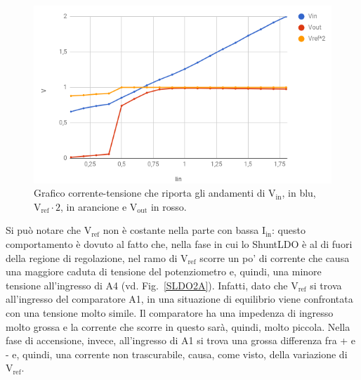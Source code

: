 \begin{figure}
\centering
\includegraphics[scale=.5]{Immagini/SLDO2Astatic}
\caption{Grafico corrente-tensione che riporta gli andamenti di $\mathrm{V_{in}}$, in blu, $\mathrm{V_{ref}\cdot 2}$, in arancione e $\mathrm{V_{out}}$ in rosso.}
\label{SLDO2Astatic}
\end{figure}
Si può notare che $\mathrm{V_{ref}}$ non è costante nella parte con bassa $\mathrm{I_{in}}$: questo comportamento è dovuto al fatto che, nella fase in cui lo ShuntLDO \`e al di fuori della regione di regolazione, nel ramo di $\mathrm{V_{ref}}$ scorre un po' di corrente che causa una maggiore caduta di tensione del potenziometro e, quindi, una minore tensione all'ingresso di A4 (vd. Fig.~\ref{SLDO2A}).
Infatti, dato che $\mathrm{V_{ref}}$ si trova all'ingresso del comparatore A1, in una situazione di equilibrio viene confrontata con una tensione molto simile.
Il comparatore ha una impedenza di ingresso molto grossa e la corrente che scorre in questo sarà, quindi, molto piccola.
Nella fase di accensione, invece, all'ingresso di A1 si trova una grossa differenza fra + e - e, quindi, una corrente non trascurabile, causa, come visto, della variazione di $\mathrm{V_{ref}}$.
